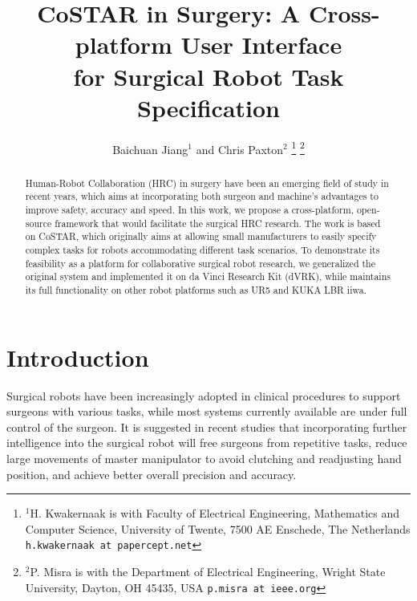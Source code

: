 \documentclass[letterpaper, 10 pt, conference]{ieeeconf}
\title{\huge \bf
CoSTAR in Surgery: A Cross-platform User Interface \\for Surgical Robot Task Specification
}
\author{Baichuan Jiang$^{1}$ and Chris Paxton$^{2}$
\thanks{$^{1}$H. Kwakernaak is with Faculty of Electrical Engineering, Mathematics and Computer Science,
        University of Twente, 7500 AE Enschede, The Netherlands
        {\tt\small h.kwakernaak at papercept.net}}
\thanks{$^{2}$P. Misra is with the Department of Electrical Engineering, Wright State University,
        Dayton, OH 45435, USA
        {\tt\small p.misra at ieee.org}}%
}
\begin{document}
\maketitle
\thispagestyle{empty}
\pagestyle{empty}


\begin{abstract}

Human-Robot Collaboration (HRC) in surgery have been an emerging field of study in recent years, which aims at incorporating both surgeon and machine’s advantages to improve safety, accuracy and speed. In this work, we propose a cross-platform, open-source framework that would facilitate the surgical HRC research. The work is based on CoSTAR, which originally aims at allowing small manufacturers to easily specify complex tasks for robots accommodating different task scenarios. To demonstrate its feasibility as a platform for collaborative surgical robot research, we generalized the original system and implemented it on da Vinci Research Kit (dVRK), while maintains its full functionality on other robot platforms such as UR5 and KUKA LBR iiwa.  

\end{abstract}


\section{Introduction}

Surgical robots have been increasingly adopted in clinical procedures to support surgeons with various tasks, while most systems currently available are under full control of the surgeon. It is suggested in recent studies \cite{padoy2011human,berthet2016hubot,bauzano2016collaborative,hu2015semi} that incorporating further intelligence into the surgical robot will free surgeons from repetitive tasks, reduce large movements of master manipulator to avoid clutching and readjusting hand position, and achieve better overall precision and accuracy. 
\end{document}
